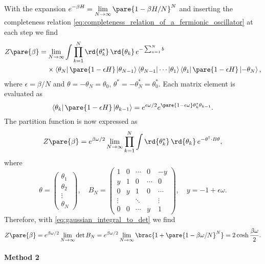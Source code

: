 \documentclass[hidelinks]{article}
\begin{document}
With the expansion $\displaystyle e^{-\beta H} = \lim_{N\rightarrow \infty} \pare{1-\beta H/N}^N$ and inserting the completeness relation \eqref{eq:completeness_relation_of_a_fermionic_oscillator} at each step we find
\begin{align*}
    Z\pare{\beta} &= \lim_{N\rightarrow \infty}\int \prod_{k=1}^N \rd{\theta_k^*}\,\rd{\theta_k}\, e^{-\sum_{n=1}^Nb} \\
    &\phantom{=\ } \times \bra{\theta_N}\pare{1-\epsilon H}\ket{\theta_{N-1}}\bra{\theta_{N-1}}\cdots \ket{\theta_1}\bra{\theta_1}\pare{1-\epsilon H}\ket{-\theta_N},
\end{align*}
where $\epsilon = \beta/N$ and $\theta = -\theta_N = \theta_0$, $\theta^* = -\theta^*_N = \theta^*_0$. Each matrix element is evaluated as
\[ \bra{\theta_k}\pare{1-\epsilon H}\ket{\theta_{k-1}} = e^{\epsilon \omega/2}e^{\pare{1-\epsilon\omega}\theta_k^*\theta_{k-1}}. \]
The partition function is now expressed as
\begin{equation}
    \label{eq:gaussian_integral_form_of_partition_function_of_fermionic_oscillator}
    Z\pare{\beta} = e^{\beta\omega/2}\lim_{N\rightarrow \infty} \prod_{k=1}^N \int \rd{\theta_k^*}\,\rd{\theta_k}\, e^{-\theta^\dagger\cdot B\theta},
\end{equation}
where
\[ \theta = \begin{pmatrix}
    \theta_1 \\ \theta_2 \\ \vdots \\ \theta_N
\end{pmatrix},\quad B_N = \begin{pmatrix}
    1 & 0 & \cdots & 0 & -y \\
    y & 1 & 0 & \cdots & 0 \\
    0 & y & 1 & 0 & \cdots \\
    \vdots & & \ddots & & \vdots \\
    0 & 0 & \cdots & y & 1
\end{pmatrix},\quad y = -1+\epsilon\omega. \]
Therefore, with \eqref{eq:gaussian_integral_to_det} we find
\[ Z\pare{\beta} = e^{\beta\omega/2}\lim_{N\rightarrow \infty} \det B_N = e^{\beta\omega/2}\lim_{N\rightarrow \infty} \brac{1+\pare{1-\beta\omega/N}^N} = 2\cosh \frac{\beta \omega}{2}. \]


\paragraph{Method 2} %
\label{par:method_2}
\end{document}
